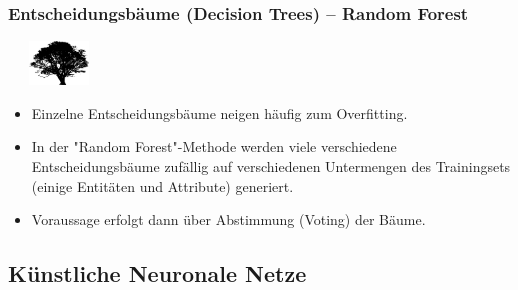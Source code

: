 \documentclass[aspectratio=169]{beamer}
\begin{document}
\begin{frame}
  \frametitle{Entscheidungsbäume (Decision Trees) -- Random Forest}
  \begin{block}{}
    \vspace{0.5cm}
    \begin{minipage}{0.15\textwidth}
      \ \ \
      \includegraphics[width=1.6cm]{images/publicdomainvectors_Chrisdesign_Tree_silhouettes_5.pdf}
    \end{minipage}
    \hfill
    \begin{minipage}{0.84\textwidth}
      \begin{itemize}
      \item Einzelne Entscheidungsbäume neigen häufig zum Overfitting.
      \item In der "Random Forest"-Methode werden viele verschiedene
        Entscheidungsbäume zufällig auf verschiedenen Untermengen des
        Trainingsets (einige Entitäten und Attribute) generiert.
      \item Voraussage erfolgt dann über Abstimmung (Voting) der
        Bäume.
      \end{itemize}
    \end{minipage}
    \vspace{0.5cm}
  \end{block}
\end{frame}

\subsection{Künstliche Neuronale Netze}

\setcounter{tocdepth}{2}
\begin{frame}{}
   \tableofcontents[currentsubsection,hideothersubsections,
     subsectionstyle=show/shaded]
\end{frame}
\end{document}
